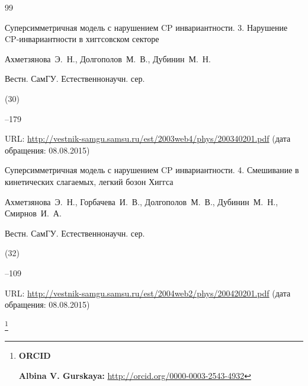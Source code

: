 \begin{thebibliography}{99}







\paper Суперсимметричная модель с нарушением CP инвариантности. 3. Нарушение CP-инвариантности в хиггсовском секторе 

\by Ахметзянова~Э.~Н., Долгополов~М.~В., Дубинин~М.~Н. 

\jour Вестн. СамГУ. Естественнонаучн. сер.


(30)

--179

\elink URL: \url{http://vestnik-samgu.samsu.ru/est/2003web4/phys/200340201.pdf} (дата обращения: 08.08.2015)




\paper Суперсимметричная модель с нарушением CP инвариантности. 4. Смешивание в кинетических слагаемых, легкий бозон Хиггса 

\by Ахметзянова~Э.~Н., Горбачева~И.~В., Долгополов~М.~В., Дубинин~М.~Н., Смирнов~И.~А. 

\jour Вестн. СамГУ. Естественнонаучн. сер.


(32)

--109

\elink URL: \url{http://vestnik-samgu.samsu.ru/est/2004web2/phys/200420201.pdf} (дата обращения: 08.08.2015)







\end{thebibliography}



\RuDate





\bigskip



\makeentitle









\thanks{{\bf ORCID}



{\bf Albina V. Gurskaya:} \url{http://orcid.org/0000-0003-2543-4932}



}





